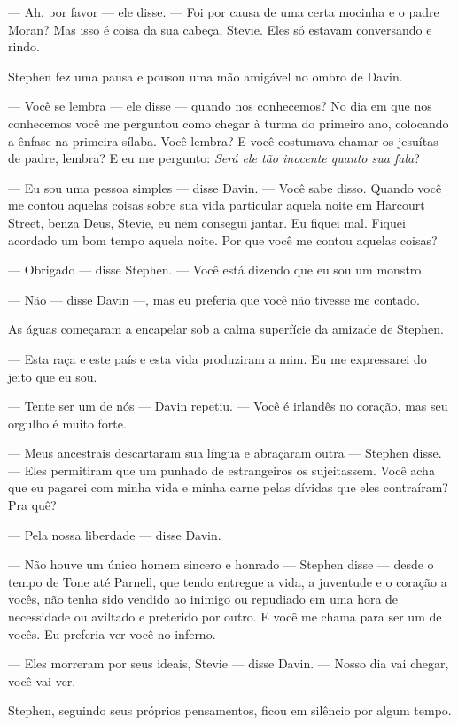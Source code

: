  --- Ah, por favor --- ele disse. --- Foi por causa de uma certa mocinha e o padre
Moran? Mas isso é coisa da sua cabeça, Stevie. Eles só estavam
conversando e rindo.

Stephen fez uma pausa e pousou uma mão amigável no ombro de Davin.

 --- Você se lembra --- ele disse --- quando nos conhecemos? No dia em que nos
conhecemos você me perguntou como chegar à turma do primeiro ano,
colocando a ênfase na primeira sílaba. Você lembra? E você costumava
chamar os jesuítas de padre, lembra? E eu me pergunto: \textit{Será ele
tão inocente quanto sua fala}?

 --- Eu sou uma pessoa simples --- disse Davin. --- Você sabe disso. Quando você
me contou aquelas coisas sobre sua vida particular aquela noite em
Harcourt Street, benza Deus, Stevie, eu nem consegui jantar. Eu fiquei
mal. Fiquei acordado um bom tempo aquela noite. Por que você me contou
aquelas coisas?

 --- Obrigado --- disse Stephen. --- Você está dizendo que eu sou um monstro.

 --- Não --- disse Davin ---, mas eu preferia que você não tivesse me contado.

As águas começaram a encapelar sob a calma superfície da amizade de
Stephen.

 --- Esta raça e este país e esta vida produziram a mim. Eu me expressarei
do jeito que eu sou.

 --- Tente ser um de nós --- Davin repetiu. --- Você é irlandês no coração, mas
seu orgulho é muito forte.

 --- Meus ancestrais descartaram sua língua e abraçaram outra --- Stephen
disse. --- Eles permitiram que um punhado de estrangeiros os sujeitassem.
Você acha que eu pagarei com minha vida e minha carne pelas dívidas
que eles contraíram? Pra quê?

 --- Pela nossa liberdade --- disse Davin.

 --- Não houve um único homem sincero e honrado --- Stephen disse --- desde o
tempo de Tone até Parnell, que tendo entregue a vida, a juventude e o
coração a vocês, não tenha sido vendido ao inimigo ou repudiado em uma
hora de necessidade ou aviltado e preterido por outro. E você me chama
para ser um de vocês. Eu preferia ver você no inferno.

 --- Eles morreram por seus ideais, Stevie --- disse Davin. --- Nosso dia vai
chegar, você vai ver.

Stephen, seguindo seus próprios pensamentos, ficou em silêncio por algum
tempo.

